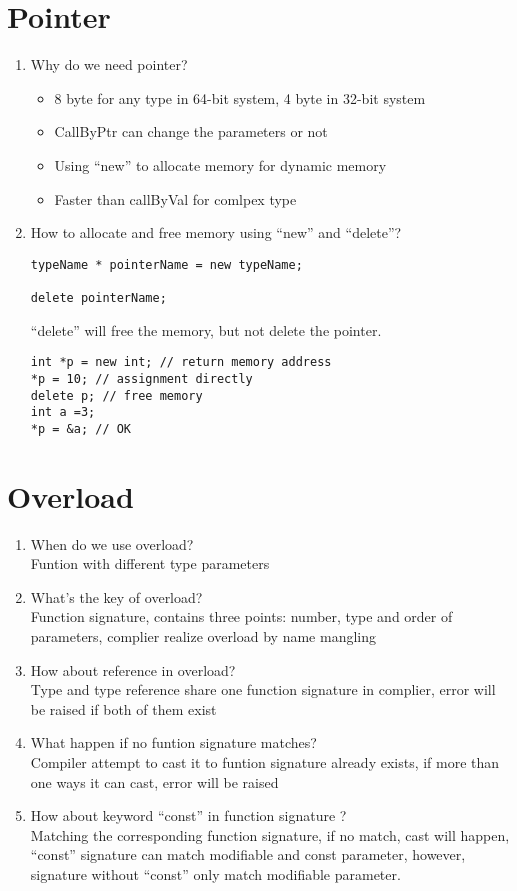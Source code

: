\documentclass[10pt,a4paper,oneside]{article}
\begin{document}
\section{Pointer}
\begin{enumerate}[1.]
\item Why do we need pointer?
\begin{itemize}
\item 8 byte for any type in 64-bit system, 4 byte in 32-bit system
\item CallByPtr can change the parameters or not
\item Using ``new'' to allocate memory for dynamic memory
\item Faster than callByVal for comlpex type
\end{itemize}
\item How to allocate and free memory using ``new'' and ``delete''?\\
\begin{lstlisting}
typeName * pointerName = new typeName;

delete pointerName;
\end{lstlisting}
``delete'' will free the memory, but not delete the pointer.
\begin{lstlisting}
int *p = new int; // return memory address
*p = 10; // assignment directly
delete p; // free memory
int a =3;
*p = &a; // OK
\end{lstlisting}
\end{enumerate}
\section{Overload}
\begin{enumerate}[1.]
\item When do we use overload?\\
Funtion with different type parameters
\item What's the key of overload?\\
Function signature, contains three points: number, type and order of parameters, complier realize overload by name mangling
\item How about reference in overload?\\
Type and type reference share one function signature in complier, error will be raised if both of them exist
\item What happen if no funtion signature matches?\\
Compiler attempt to cast it to funtion signature already exists, if more than one ways it can cast, error will be raised
\item How about keyword ``const'' in function signature ?\\
Matching the corresponding function signature, if no match,  cast will happen, ``const'' signature can match modifiable and const parameter, however, signature without ``const'' only match modifiable parameter.
\end{enumerate}
\end{document}
